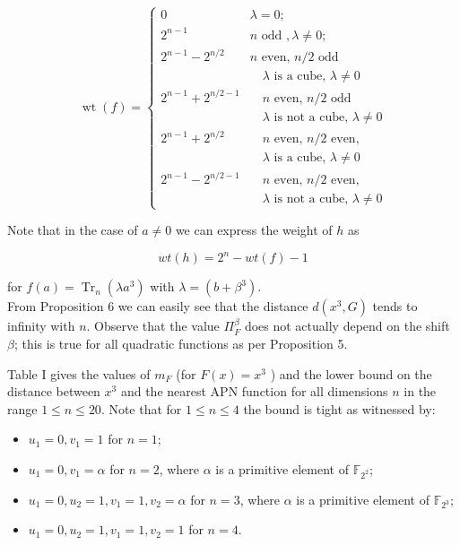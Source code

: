 \documentclass[10pt]{article}
\begin{document}
\[
\operatorname{wt}(f)= \begin{cases}0 & \lambda=0 ;  \tag{15}\\ 2^{n-1} & n \text { odd }, \lambda \neq 0 ; \\ 2^{n-1}-2^{n / 2} & n \text { even, } n / 2 \text { odd } \\ & \quad \lambda \text { is a cube, } \lambda \neq 0 \\ 2^{n-1}+2^{n / 2-1} & \quad n \text { even, } n / 2 \text { odd } \\ & \quad \lambda \text { is not a cube, } \lambda \neq 0 \\ 2^{n-1}+2^{n / 2} & \quad n \text { even, } n / 2 \text { even, } \\ & \quad \lambda \text { is a cube, } \lambda \neq 0 \\ 2^{n-1}-2^{n / 2-1} & \quad n \text { even, } n / 2 \text { even, } \\ & \quad \lambda \text { is not a cube, } \lambda \neq 0\end{cases}
\]

Note that in the case of $a \neq 0$ we can express the weight of $h$ as


\begin{equation*}
w t(h)=2^{n}-w t(f)-1 \tag{16}
\end{equation*}


for $f(a)=\operatorname{Tr}_{n}\left(\lambda a^{3}\right)$ with $\lambda=\left(b+\beta^{3}\right)$.\\
From Proposition 6 we can easily see that the distance $d\left(x^{3}, G\right)$ tends to infinity with $n$. Observe that the value $\Pi_{F}^{\beta}$ does not actually depend on the shift $\beta$; this is true for all quadratic functions as per Proposition 5.

Table I gives the values of $m_{F}$ (for $F(x)=x^{3}$ ) and the lower bound on the distance between $x^{3}$ and the nearest APN function for all dimensions $n$ in the range $1 \leq n \leq 20$. Note that for $1 \leq n \leq 4$ the bound is tight as witnessed by:

\begin{itemize}
  \item $u_{1}=0, v_{1}=1$ for $n=1$;
  \item $u_{1}=0, v_{1}=\alpha$ for $n=2$, where $\alpha$ is a primitive element of $\mathbb{F}_{2^{2}}$;
  \item $u_{1}=0, u_{2}=1, v_{1}=1, v_{2}=\alpha$ for $n=3$, where $\alpha$ is a primitive element of $\mathbb{F}_{2^{3}}$;
  \item $u_{1}=0, u_{2}=1, v_{1}=1, v_{2}=1$ for $n=4$.
\end{itemize}
\end{document}
